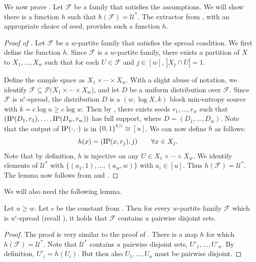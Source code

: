 \documentclass{toc}
\newcommand{\IP}{\textnormal{IP}}
\newcommand{\calF}{\mathcal{F}} %
\begin{document}
We now prove . Let $\calF$ be a family
%
that satisfies the assumptions.
We will show there is a function $h$ such that $h(\calF) = \mathcal{U}^*$.
The extractor from
, %
with an appropriate choice of seed, provides such a function $h$.

\begin{proof}[Proof of ]
Let $\calF$ be a %
$w$-partite  %
family
%
that satisfies the spread condition.
We first define the function $h$. Since $\calF$ is a
%
$w$-partite family,  %
there exists a partition of $X$ to $X_1,\dots,X_{w}$
such that for each $U\in\calF$ and $j\in[w]$, $|X_{j}\cap U| = 1$.

Define the sample space as $X_{1}\times\cdots\times X_{w}$. With a slight abuse of %
notation,  %
we identify $\calF\subseteq \mathcal{P}(X_{1}\times\cdots\times X_{w}$), and let $D$ be a uniform distribution over $\calF$.
Since $\calF$ is $u^{c}$-spread, the distribution $D$ is a $(w, \log X, k)$ block min-entropy source with $k = c \log u \ge c \log w$.
Then by , there exists seeds $r_1,\dots,r_w$ such that $(\IP(D_1, r_{1}),\dots,\IP(D_{w},r_{w}))$ has full support,
where $D=(D_1,\ldots,D_w)$. Note that the output of $\IP(\cdot,\cdot)$ is in $\{0,1\}^{k/c} \cong [u]$.
We can now define $h$ as follows:
$$
h(x) = (\IP(x, r_{j}), j) \qquad \forall x \in X_j.
$$
Note that by definition, $h$ is injective on any $U \in X_1 \times \cdots \times X_w$. We identify elements of $\mathcal{U}^*$ with
$\{(a_1,1),\ldots,(a_w,w)\}$ with $a_i \in [u]$. Thus $h(\calF) = \mathcal{U}^*$. The lemma now follows
from  and .
\end{proof}

We will also need the following lemma.
\begin{lemma}
\label{lemma:disjoint}
Let $u \ge w$. Let $c$ be the constant from .
Then for every %
$w$-partite family  %
$\calF$ which is $u^c$-spread (recall ),
it holds that $\calF$ contains $u$ pairwise disjoint sets.
\end{lemma}

\begin{proof}
The proof is very similar to the proof of .
There is a map $h$ for which $h(\calF) = \mathcal{U}^*$.
Note that $\mathcal{U}^*$ contains $u$ pairwise disjoint sets,
$U'_1,\ldots,U'_u$. By definition, $U'_i = h(U_i)$. But then
also $U_1,\ldots,U_u$ must be pairwise disjoint.
\end{proof}
\end{document}
